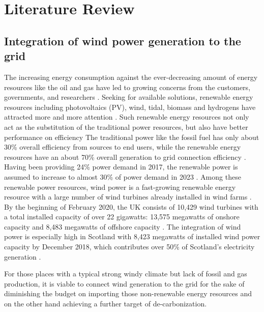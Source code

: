 \documentclass[12pt,a4paper]{report}
\begin{document}
        \section{Literature Review}
        \subsection{Integration of wind power generation to the grid}
        The increasing energy consumption against the ever-decreasing amount of
        energy resources like the oil and gas have led to
        growing concerns from the customers, governments, and researchers \cite{book:ahuja_2015} \cite{book:miller_spoolman_2008}.
        Seeking for available solutions, renewable energy resources including
        photovoltaics (PV), wind, tidal, biomass and hydrogens have attracted
        more and more attention \cite{website:runyon_2019}. Such renewable energy resources not only act as the substitution of the traditional power resources,
        but also have better performance on efficiency The traditional power like the fossil fuel has only about 30\% overall efficiency from sources to end users, while the renewable energy resources have an about 70\% overall generation to grid connection efficiency \cite{paper:renewableefficiency}. 
        Having been providing 24\% power demand in 2017, the renewable power is assumed to increase to almost 30\% of power demand in 2023 \cite{website:iea}.
        Among these renewable power resources, wind power is a fast-growing
        renewable energy resource with a large number of wind turbines already
        installed in wind farms \cite{website:energytrendsUK}. %
        By the beginning of February 2020, the UK consists of 10,429 wind turbines with a total installed capacity of over 22 gigawatts: 13,575 megawatts of onshore capacity and 8,483 megawatts of offshore capacity \cite{website:UKWindPower}.
        The integration of wind power is especially high in Scotland with 8,423 megawatts of installed wind power capacity by December 2018, which contributes over 50\% of Scotland's electricity generation \cite{website:scotlandGovRenewableTarget} \cite{website:renewableenergyworld_2019}.

        For those places with a typical strong windy climate but lack of fossil and gas production, 
        it is viable to connect wind generation to the grid for the sake of diminishing the budget on importing those non-renewable 
        energy resources and on the other hand achieving a further target of de-carbonization.
        
\end{document}
